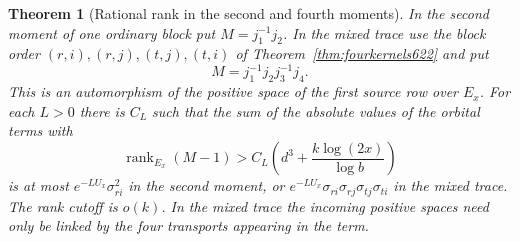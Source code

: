 \documentclass[a4paper,11pt]{article}
\newtheorem{theorem}[proposition]{Theorem}
\theoremstyle{definition}
\theoremstyle{remark}
\numberwithin{equation}{section}
\begin{document}
\begin{theorem}[Rational rank in the second and fourth moments]
\leavevmode\label{thm:rationalgram629}
In the second moment of one ordinary block put \(M=j_1^{-1}j_2\).
In the mixed trace use the block order
\((r,i),(r,j),(t,j),(t,i)\) of Theorem~\ref{thm:fourkernels622}
and put
\[
                        M=j_1^{-1}j_2j_3^{-1}j_4 .
\]
This is an automorphism of the positive space of the first source
row over \(E_x\). For each \(L>0\) there is \(C_L\) such that the
sum of the absolute values of the orbital terms with
\[
       \operatorname{rank}_{E_x}(M-1)>
         C_L\left(d^3+\frac{k\log(2x)}{\log b}\right)
\]
is at most \(e^{-LU_x}\sigma_{ri}^2\) in the second moment, or
\(e^{-LU_x}\sigma_{ri}\sigma_{rj}\sigma_{tj}\sigma_{ti}\)
in the mixed trace. The rank cutoff is \(o(k)\). In the mixed
trace the incoming positive spaces need only be linked by the
four transports appearing in the term.
\end{theorem}
\end{document}
